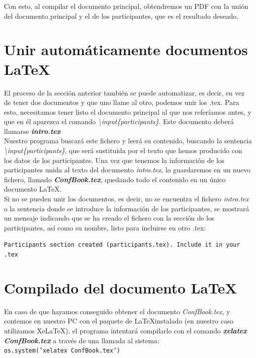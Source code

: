\documentclass[a4paper, 12pt]{book}
\begin{document}
Con esto, al compilar el documento principal, obtendremos un PDF con la unión del documento principal y el de los participantes, que es el resultado deseado.


\section{Unir automáticamente documentos \LaTeX}
\label{sec:uneLatex}
El proceso de la sección anterior también se puede automatizar, es decir, en vez de tener dos documentos y que uno llame al otro, podemos unir los .tex. Para esto, necesitamos tener listo el documento principal al que nos referíamos antes, y que en él aparezca el comando \mbox{\textit{\textbackslash input\{participants\}}}. Este documento deberá llamarse \textbf{\textit{intro.tex}}\\

Nuestro programa buscará este fichero y leerá su contenido, buscando la sentencia \mbox{\textit{\textbackslash input\{participants\}}}, que será sustituida por el texto que hemos producido con los datos de los participantes. Una vez que tenemos la información de los participantes unida al texto del documento \textit{intro.tex}, lo guardaremos en un nuevo fichero, llamado \textbf{\textit{ConfBook.tex}}, quedando todo el contenido en un único documento \LaTeX.\\

Si no se pueden unir los documentos, es decir, no se encuentra el fichero \textit{intro.tex} o la sentencia donde se introduce la información de los participantes, se mostrará un mensaje indicando que se ha creado el fichero con la sección de los participantes, así como su nombre, listo para incluirse en otro .tex:

\texttt{Participants section created (participants.tex). Include it in your .tex}



\section{Compilado del documento \LaTeX}
\label{sec:compilado}
En caso de que hayamos conseguido obtener el documento \textit{ConfBook.tex}, y contemos en nuestro PC con el paquete de \LaTeX \thinspace instalado (en nuestro caso utilizamos XeLaTeX), el programa intentará compilarlo con el comando \textbf{\textit{xelatex ConfBook.tex}} a través de una llamada al sistema:\\
\texttt{os.system('xelatex ConfBook.tex')}\\
\end{document}
